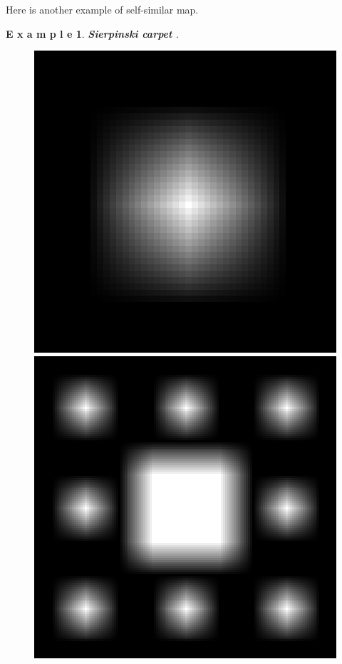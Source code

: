 \documentclass[12pt]{article}
\theoremstyle{plain}
\newtheorem{example}{\textbf{E x a m p l e}}[section]
\begin{document}
Here is another example of self-similar map.
\begin{example}\textbf{Sierpinski carpet}
.\\[4ex]
\begin{figure}[H]
\begin{minipage}[c][0.15\width]{
   0.15\textwidth}
   \centering
   \includegraphics[width=1\textwidth]{figure/section4/carpet1.png}
\end{minipage}
\begin{minipage}[c][0.15\width]{
   0.15\textwidth}
   \centering
   \includegraphics[width=1\textwidth]{figure/section4/carpet2.png}

\end{minipage}
\end{figure}
\end{example}
\end{document}

